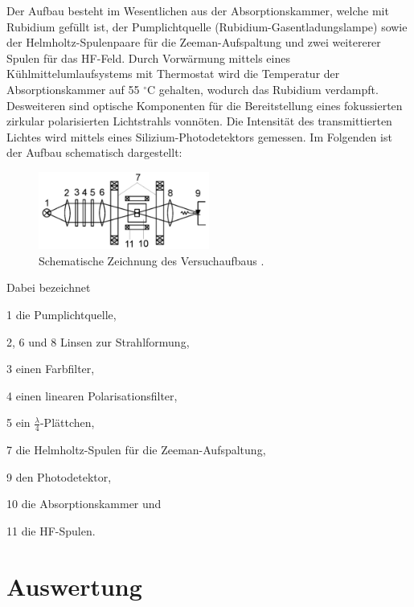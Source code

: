 \documentclass[bigchapter,colorback,accentcolor=tud4b,linedtoc,11pt]{tudreport}
\begin{document}
Der Aufbau besteht im Wesentlichen aus der Absorptionskammer, welche mit Rubidium gefüllt ist, der Pumplichtquelle (Rubidium-Gasentladungslampe) sowie der Helmholtz-Spulenpaare für die Zeeman-Aufspaltung und zwei weitererer Spulen für das HF-Feld. Durch Vorwärmung mittels eines Kühlmittelumlaufsystems mit Thermostat wird die Temperatur der Absorptionskammer auf 55 $^{\circ}$C gehalten, wodurch das Rubidium verdampft. Desweiteren sind optische Komponenten für die Bereitstellung eines fokussierten zirkular polarisierten Lichtstrahls vonnöten. Die Intensität des transmittierten Lichtes wird mittels eines Silizium-Photodetektors gemessen. Im Folgenden ist der Aufbau schematisch dargestellt:

\begin{figure}[H] 
  \centering
     \includegraphics[width=0.5\textwidth]{img/Aufbau.jpg}
     \caption{Schematische Zeichnung des Versuchaufbaus \cite{Anleitung}.}
\end{figure}

Dabei bezeichnet

1 die Pumplichtquelle,

2, 6 und 8 Linsen zur Strahlformung,

3 einen Farbfilter,

4 einen linearen Polarisationsfilter,

5 ein $\frac{\lambda}{4}$-Plättchen,

7 die Helmholtz-Spulen für die Zeeman-Aufspaltung,

9 den Photodetektor,

10 die Absorptionskammer und

11 die HF-Spulen.

\chapter{Auswertung}
\end{document}
